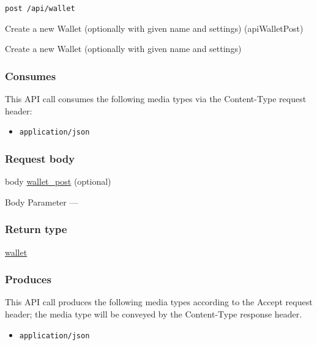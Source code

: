 \protect\hypertarget{apiWalletPost}{}{}

\begin{verbatim}
post /api/wallet
\end{verbatim}

Create a new Wallet (optionally with given name and settings)
({apiWalletPost})

Create a new Wallet (optionally with given name and settings)

\hypertarget{consumes-58}{%
\subsubsection{Consumes}\label{consumes-58}}

This API call consumes the following media types via the {Content-Type}
request header:

\begin{itemize}
\tightlist
\item
  \texttt{application/json}
\end{itemize}

\hypertarget{request-body-58}{%
\subsubsection{Request body}\label{request-body-58}}

body \protect\hyperlink{wallet_post}{wallet\_post} (optional)

{Body Parameter} ---

\hypertarget{return-type-140}{%
\subsubsection{Return type}\label{return-type-140}}

\protect\hyperlink{wallet}{wallet}

\hypertarget{produces-178}{%
\subsubsection{Produces}\label{produces-178}}

This API call produces the following media types according to the
{Accept} request header; the media type will be conveyed by the
{Content-Type} response header.

\begin{itemize}
\tightlist
\item
  \texttt{application/json}
\end{itemize}

